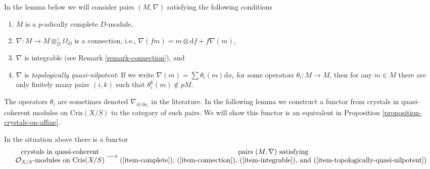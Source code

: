 \noindent
In the lemma below we will consider pairs $(M, \nabla)$ satisfying the
following conditions
\begin{enumerate}
\item
\label{item-complete}
$M$ is a $p$-adically complete $D$-module,
\item
\label{item-connection}
$\nabla : M \to M \otimes^\wedge_D \Omega_D$ is a connection, i.e.,
$\nabla(fm) = m \otimes \text{d}f + f\nabla(m)$,
\item
\label{item-integrable}
$\nabla$ is integrable
(see Remark \ref{remark-connection}), and
\item
\label{item-topologically-quasi-nilpotent}
$\nabla$ is {\it topologically quasi-nilpotent}: If we write
$\nabla(m) = \sum \theta_i(m)\text{d}x_i$ for some operators
$\theta_i : M \to M$, then for any $m \in M$ there are only finitely
many pairs $(i, k)$ such that $\theta_i^k(m) \not \in pM$.
\end{enumerate}
The operators $\theta_i$ are sometimes denoted
$\nabla_{\partial/\partial x_i}$ in the literature.
In the following lemma we construct a functor from crystals in quasi-coherent
modules on $\text{Cris}(X/S)$ to the category of such pairs. We will show
this functor is an equivalent in
Proposition \ref{proposition-crystals-on-affine}.

\begin{lemma}
\label{lemma-crystals-on-affine}
In the situation above there is a functor
$$
\begin{matrix}
\text{crystals in quasi-coherent} \\
\mathcal{O}_{X/S}\text{-modules on }\text{Cris}(X/S)
\end{matrix}
\longrightarrow
\begin{matrix}
\text{pairs }(M, \nabla)\text{ satisfying} \\
\text{(\ref{item-complete}), (\ref{item-connection}),
(\ref{item-integrable}), and (\ref{item-topologically-quasi-nilpotent})}
\end{matrix}
$$
\end{lemma}

